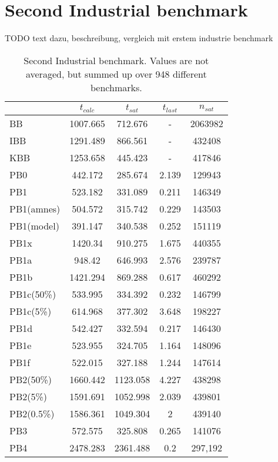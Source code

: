 \section{Second Industrial benchmark}

TODO text dazu, beschreibung, vergleich mit erstem industrie benchmark

\begin{wraptable}{R}{8cm}
\begin{tabular}{l| c c c c}
& $t_{calc}$ & $t_{sat}$ & $t_{last}$ & $n_{sat}$ \\
 \hline
BB & 1007.665 & 712.676 & - & 2063982 \\
IBB & 1291.489 & 866.561 & - & 432408 \\
KBB & 1253.658 & 445.423 & - & 417846 \\
PB0 & 442.172 & 285.674 & 2.139 & 129943 \\
PB1 & 523.182 & 331.089 & 0.211 & 146349 \\
PB1(amnes) & 504.572 & 315.742 & 0.229 & 143503 \\
PB1(model) & 391.147 & 340.538 & 0.252 & 151119 \\
PB1x & 1420.34 & 910.275 & 1.675 & 440355 \\
PB1a & 948.42 & 646.993 & 2.576 & 239787 \\
PB1b & 1421.294 & 869.288 & 0.617 & 460292 \\
PB1c(50\%) & 533.995 & 334.392 & 0.232 & 146799 \\
PB1c(5\%) & 614.968 & 377.302 & 3.648 & 198227 \\
PB1d & 542.427 & 332.594 & 0.217 & 146430 \\
PB1e & 523.955 & 324.705 & 1.164 & 148096 \\
PB1f & 522.015 & 327.188 & 1.244 & 147614 \\
PB2(50\%) & 1660.442 & 1123.058 & 4.227 & 438298 \\
PB2(5\%) & 1591.691 & 1052.998 & 2.039 & 439801 \\
PB2(0.5\%) & 1586.361 & 1049.304 & 2 & 439140 \\
PB3 & 572.575 & 325.808 & 0.265 & 141076 \\
PB4 & 2478.283 & 2361.488 & 0.2 &297,192 \\
\end{tabular}
\caption{Second Industrial benchmark. Values are not averaged, but summed up over 948 different benchmarks.}
\label{tab:vonThore2pof} %
\end{wraptable}


